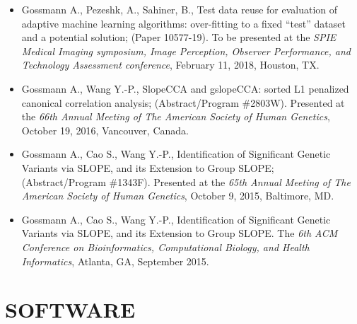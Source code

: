 \documentclass[overlapped, line, 10pt]{res} %
\begin{document}
\begin{resume}
\begin{itemize}
  \item
    Gossmann A., Pezeshk, A., Sahiner, B., Test data reuse for evaluation of adaptive machine learning algorithms: over-fitting to a fixed ``test'' dataset and a potential solution;
    (Paper 10577-19).
    To be presented at the \textit{SPIE Medical Imaging symposium, Image Perception, Observer Performance, and Technology Assessment conference},
    February 11, 2018, Houston, TX.
  \item
    Gossmann A., Wang Y.-P., SlopeCCA and gslopeCCA: sorted L1 penalized canonical correlation analysis;
    (Abstract/Program \#2803W).
    Presented at the \textit{66th Annual Meeting of The American Society of Human Genetics},
    October 19, 2016, Vancouver, Canada.
  \item
    Gossmann A., Cao S., Wang Y.-P., Identification of Significant Genetic Variants via SLOPE, and its Extension to Group SLOPE;
    (Abstract/Program \#1343F).
    Presented at the \textit{65th Annual Meeting of The American Society of Human Genetics},
    October 9, 2015, Baltimore, MD.
  \item
    Gossmann A., Cao S., Wang Y.-P., Identification of Significant Genetic Variants via SLOPE, and its Extension to Group SLOPE.
    The \textit{6th ACM Conference on Bioinformatics, Computational Biology, and Health Informatics},
    Atlanta, GA, September 2015.
\end{itemize}


\section{SOFTWARE}


\end{resume}
\end{document}
